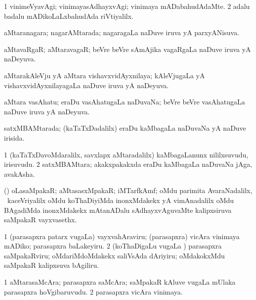 \bentry
{}
\gl{\kirxvi}
\bmng
\bnum
\num{1} vinimeVyavAgi; vinimayasAdhayxvAgi; vinimaya mADabahudAdaMte. 
\num{2} adalu badalu mADikoLaLxbahudAda riVtiyalilx. 
\enum
\emng
\eentry

\bentry
{}
\gl{\gu}
\bmng
aMtaranagara; nagarAMtarada; nagaragaLa naDuve iruva yA parxyANisuva. 
\emng
\eentry

\bentry
{}
\gl{\gu}
\bmng
aMtavaRgaR; aMtaravagaR; beVre beVre sAmAjika vagaRgaLa naDuve iruva yA naDeyuva. 
\emng
\eentry

\bentry
{}
\gl{\gu}
\bmng
aMtarakAleVju yA aMtara vishavxvidAyxnilaya; kAleVjugaLa yA vishavxvidAyxnilayagaLa naDuve iruva yA naDeyuva. 
\emng
\eentry

\bentry
{}
\gl{\gu}
\bmng
aMtara vasAhatu; eraDu vasAhatugaLa naDuvaNa; beVre beVre vasAhatugaLa naDuve iruva yA naDeyuva. 
\emng
\eentry

\bentry
{}
\gl{\gu}
\bmng
satxMBAMtarada; (kaTaTxDadalilx) eraDu kaMbagaLa naDuvaNa yA naDuve irisida. 
\emng
\eentry

\bentry
{}
\gl{\nA}
\bmng
\bnum
\num{1} (kaTaTxDavoMdaralilx, savxlapx aMtaradalilx) kaMbagaLanunx nililxsuvudu, irisuvudu. 
\num{2} satxMBAMtara; akakxpakakxda eraDu kaMbagaLa naDuvaNa jAga, avakAsha. 
\enum
\emng
\eentry

\bentry
{}
\gl{\nA}
\bmng
(\AmA) oLasaMpakaR; aMtasasxMpakaR; iMTarfkAmf; oMdu parimita AvaraNadalilx, \udA\ kaceVriyalilx oMdu koThaDiyiMda inonxMdakekx yA vimAnadalilx oMdu BAgadiMda inonxMdakekx mAtanADalu sAdhayxvAguvaMte kalipxsiruva saMpakaR vayxvasethx. 
\emng
\eentry

\bentry
{}
\gl{\akirx}
\bmng
\bnum
\num{1} (parasapxra patarx \mo vugaLa) vayxvahAraviru; (parasapxra) vicAra vinimaya mADiko; parasapxra baLakeyiru. 
\num{2} (koThaDigaLu \mo vugaLa \vi) parasapxra saMpakaRviru; oMdariMdoMdakekx saliVsAda dAriyiru; oMdakokxMdu saMpakaR kalipxsuva bAgiliru. 
\enum
\emng
\eentry

\bentry
{}
\gl{\nA}
\bmng
\bnum
\num{1} aMtarasaMcAra; parasapxra saMcAra; saMpakaR kAluve \mo vugaLa mUlaka parasapxra hoVgibaruvudu. 
\num{2} parasapxra vicAra vinimaya. 
\enum
\emng
\eentry

